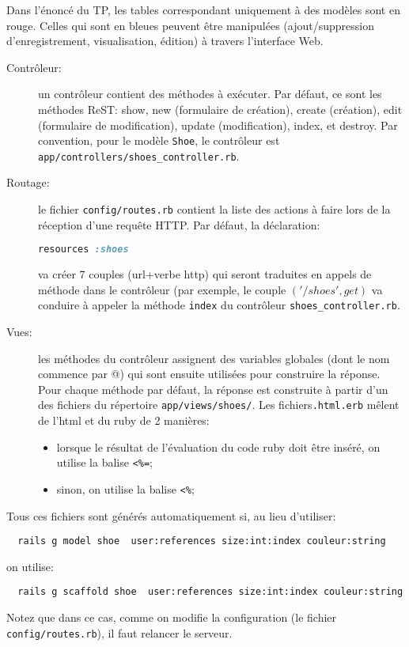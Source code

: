 \documentclass{article}
\begin{document}
Dans l'énoncé du TP, les tables correspondant uniquement à des modèles
sont en rouge. Celles qui sont en bleues peuvent être manipulées
(ajout/suppression d'enregistrement, visualisation, édition) à travers
l'interface Web.
\begin{description}
\item[Contrôleur:] un contrôleur contient des méthodes à exécuter. Par
  défaut, ce sont les méthodes ReST: show, new (formulaire de
  création), create (création), edit (formulaire de modification),
  update (modification), index, et destroy. Par convention, pour le
  modèle \texttt{Shoe}, le contrôleur est
  \texttt{app/controllers/shoes\_controller.rb}.
\item[Routage:] le fichier \texttt{config/routes.rb} contient la
  liste des actions à faire lors de la réception d'une requête HTTP. Par défaut,
la déclaration:
\begin{lstlisting}[language=ruby]
 resources :shoes
\end{lstlisting}
va créer 7 couples (url+verbe http) qui seront traduites en appels de
méthode dans le contrôleur (par exemple, le couple \(('/shoes',get)\)
va conduire à appeler la méthode \texttt{index} du contrôleur
\texttt{shoes\_controller.rb}.
\item[Vues:] les méthodes du contrôleur assignent des variables
  globales (dont le nom commence par @) qui sont ensuite utilisées
  pour construire la réponse. Pour chaque méthode par défaut, la
  réponse est construite à partir d'un des fichiers du répertoire
  \texttt{app/views/shoes/}. Les fichiers\texttt{.html.erb} mêlent de l'html
  et du ruby de 2 manières:
  \begin{itemize}
  \item lorsque le résultat de l'évaluation du code ruby doit être inséré, on utilise la balise
    \verb+<%=+;
  \item sinon, on utilise la balise \verb+<%+;
  \end{itemize}
\end{description}

Tous ces fichiers sont générés automatiquement si, au lieu d'utiliser:
\begin{lstlisting}
  rails g model shoe  user:references size:int:index couleur:string
\end{lstlisting}
on utilise:
\begin{lstlisting}
  rails g scaffold shoe  user:references size:int:index couleur:string
\end{lstlisting}
Notez que dans ce cas, comme on modifie la configuration (le fichier
\texttt{config/routes.rb}), il faut relancer le serveur.
\end{document}
